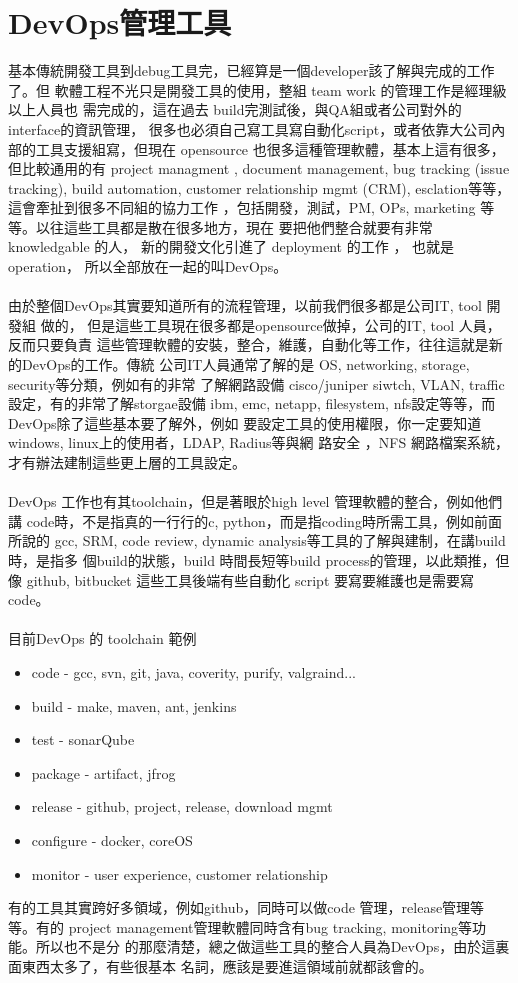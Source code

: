 \chapter{DevOps管理工具}
基本傳統開發工具到debug工具完，已經算是一個developer該了解與完成的工作了。但
軟體工程不光只是開發工具的使用，整組 team work 的管理工作是經理級以上人員也
需完成的，這在過去 build完測試後，與QA組或者公司對外的interface的資訊管理，
很多也必須自己寫工具寫自動化script，或者依靠大公司內部的工具支援組寫，但現在
opensource 也很多這種管理軟體，基本上這有很多，但比較通用的有 project managment
, document management, bug tracking (issue tracking), build automation, 
customer relationship mgmt (CRM), esclation等等，這會牽扯到很多不同組的協力工作
，包括開發，測試，PM, OPs, marketing 等等。以往這些工具都是散在很多地方，現在
要把他們整合就要有非常 knowledgable 的人， 新的開發文化引進了 deployment 的工作
， 也就是 operation， 所以全部放在一起的叫DevOps。
\\\\
由於整個DevOps其實要知道所有的流程管理，以前我們很多都是公司IT, tool 開發組
做的， 但是這些工具現在很多都是opensource做掉，公司的IT, tool 人員，反而只要負責
這些管理軟體的安裝，整合，維護，自動化等工作，往往這就是新的DevOps的工作。傳統
公司IT人員通常了解的是 OS, networking, storage, security等分類，例如有的非常
了解網路設備 cisco/juniper siwtch, VLAN, traffic設定，有的非常了解storgae設備
ibm, emc, netapp, filesystem, nfs設定等等，而DevOps除了這些基本要了解外，例如
要設定工具的使用權限，你一定要知道windows, linux上的使用者，LDAP, Radius等與網
路安全 ，NFS 網路檔案系統，才有辦法建制這些更上層的工具設定。
\\\\
DevOps 工作也有其toolchain，但是著眼於high level 管理軟體的整合，例如他們講
code時，不是指真的一行行的c, python，而是指coding時所需工具，例如前面所說的
gcc, SRM, code review, dynamic analysis等工具的了解與建制，在講build時，是指多
個build的狀態，build 時間長短等build process的管理，以此類推，但像 github,
bitbucket 這些工具後端有些自動化 script 要寫要維護也是需要寫 code。
\\\\
目前DevOps 的 toolchain 範例
\begin{itemize}
  \item code - gcc, svn, git, java, coverity, purify, valgraind...
  \item build - make, maven, ant, jenkins
  \item test - sonarQube
  \item package - artifact, jfrog
  \item release - github, project, release, download mgmt
  \item configure - docker, coreOS
  \item monitor - user experience, customer relationship
\end{itemize}
有的工具其實跨好多領域，例如github，同時可以做code 管理，release管理等等。有的
project management管理軟體同時含有bug tracking, monitoring等功能。所以也不是分
的那麼清楚，總之做這些工具的整合人員為DevOps，由於這裏面東西太多了，有些很基本
名詞，應該是要進這領域前就都該會的。

